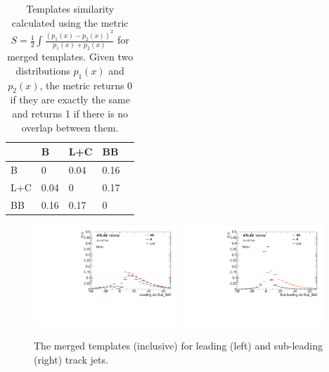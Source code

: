 \begin{table}[htpb]
\centering
\begin{tabular}{|l|l|l|l|l|}
\hline
    & B    & L+C    & BB   \\ \hline
B   & 0    & 0.04  & 0.16 \\ \hline
L+C & 0.04 & 0     & 0.17 \\ \hline
BB  & 0.16 & 0.17  & 0    \\ \hline

\end{tabular}
\caption{Templates similarity calculated using the metric $S=\frac{1}{2}\int \frac{(p_1(x)-p_2(x))^2}{p_1(x)+p_2(x)}$ for merged templates. Given two distributions $p_1(x)$ and $p_2(x)$, the metric returns 0 if they are exactly the same and returns 1 if there is no overlap between them.}
\label{tab:overlap-merged}
\end{table}


\begin{figure}[htbp]
  \centering
 \includegraphics[width=0.48\textwidth]{figures/gbb/Sub_Sd0_Fits/Canv_FitTemplate_Inclusive_x.pdf}
 \includegraphics[width=0.48\textwidth]{figures/gbb/Sub_Sd0_Fits/Canv_FitTemplate_Inclusive_y.pdf}\\
\caption{The merged templates (inclusive) for leading (left) and sub-leading (right) track jets.}
  \label{fig:gbb-templates}
\end{figure}



